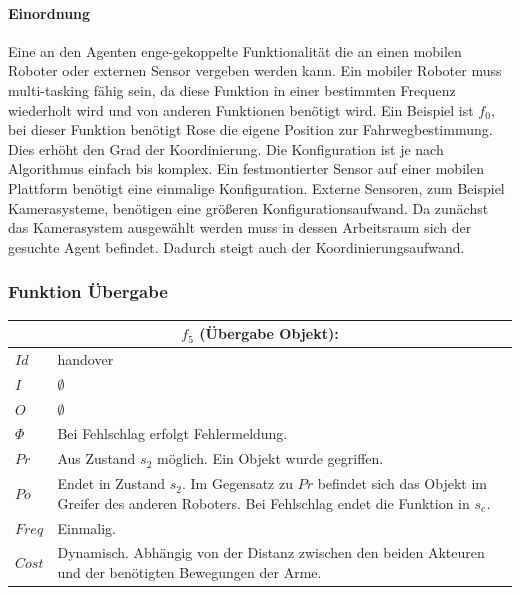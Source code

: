 \paragraph{Einordnung}
Eine an den Agenten enge-gekoppelte Funktionalität die an einen mobilen Roboter oder externen Sensor vergeben werden kann. Ein mobiler Roboter muss multi-tasking fähig sein, da diese Funktion in einer bestimmten Frequenz wiederholt wird und von anderen Funktionen benötigt wird. Ein Beispiel ist $f_0$, bei dieser Funktion benötigt Rose die eigene Position zur Fahrwegbestimmung. Dies erhöht den Grad der Koordinierung. Die Konfiguration ist je nach Algorithmus einfach bis komplex. Ein festmontierter Sensor auf einer mobilen Plattform benötigt eine einmalige Konfiguration. Externe Sensoren, zum Beispiel Kamerasysteme, benötigen eine größeren Konfigurationsaufwand. Da zunächst das Kamerasystem ausgewählt werden muss in dessen Arbeitsraum sich der gesuchte Agent befindet. Dadurch steigt auch der Koordinierungsaufwand.

\subsubsection{Funktion Übergabe}
\label{fun:han}
\begin{tabular}{|p{3cm}|p{10cm}|}
	\multicolumn{2}{c}{$f_5$ (Übergabe Objekt):}\\
	\hline  $Id$ & handover\\ 
	\hline  $I$ & $\emptyset$ \\ 
	\hline  $O$ & $\emptyset$ \\ 
	\hline  $\Phi$ & Bei Fehlschlag erfolgt Fehlermeldung.\\ 
	\hline $Pr$ & Aus Zustand $s_2$ möglich. Ein Objekt wurde gegriffen.  \\ 
	\hline $Po$ & Endet in Zustand $s_2$. Im Gegensatz zu $Pr$ befindet sich das Objekt im Greifer des anderen Roboters. Bei Fehlschlag endet die Funktion in $s_e$.\\ 
	\hline $Freq$ & Einmalig.\\ 
	\hline $Cost$ & Dynamisch. Abhängig von der Distanz zwischen den beiden Akteuren und der benötigten Bewegungen der Arme. \\
	\hline
\end{tabular} 

